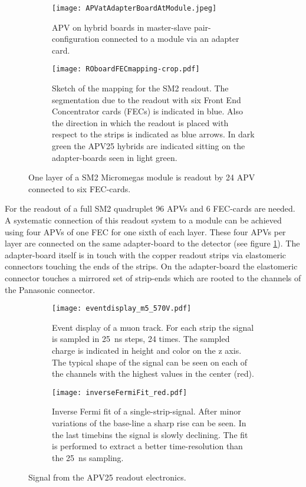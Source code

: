 \documentclass[
twoside,            %
BCOR1.4cm,          %
10pt,               %
headings=normal,    %
headsepline,        %
clearplainpage,		%
final,              %
div=14,
open=right,
bibliography=toc
]{scrreprt}
\begin{document}
\begin{figure}[!h]
	\begin{subfigure}[b]{0.48\textwidth}
		\centering
		\texttt{[image: APVatAdapterBoardAtModule.jpeg]}
		\caption{
			APV on hybrid boards in master-slave pair-configuration connected to a module via an adapter card.
		}
		\label{APVatAdapterAtModule} 
	\end{subfigure}
	\hfill
	\begin{subfigure}[b]{0.48\textwidth}
		\centering
		\texttt{[image: ROboardFECmapping-crop.pdf]}
		\caption{
			Sketch of the mapping for the SM2 readout.
			The segmentation due to the readout with six Front End Concentrator cards (FECs) is indicated in blue.
			Also the direction in which the readout is placed with respect to the strips is indicated as blue arrows.
			In dark green the APV25 hybrids are indicated sitting on the adapter-boards seen in light green.
		}
		\label{RObaordFECmapping} 
	\end{subfigure}
	\vspace{-2mm}
	\caption{
		One layer of a SM2 Micromegas module is readout by 24 APV connected to six FEC-cards.
	}
\end{figure}

For the readout of a full SM2 quadruplet 96 APVs and 6 FEC-cards are needed.
A systematic connection of this readout system to a module can be achieved using four APVs of one FEC for one sixth of each layer.
These four APVs per layer are connected on the same adapter-board to the detector (see figure \ref{APVatAdapterAtModule}).
The adapter-board itself is in touch with the copper readout strips via elastomeric connectors touching the ends of the strips.
On the adapter-board the elastomeric connector touches a mirrored set of strip-ends which are rooted to the channels of the Panasonic connector. 

\begin{figure}[!h]
	\begin{subfigure}[b]{0.48\textwidth}
		\centering
		\texttt{[image: eventdisplay\_m5\_570V.pdf]}
		\caption{
			Event display of a muon track.
			For each strip the signal is sampled in \SI{25}{ns} steps, 24 times.
			The sampled charge is indicated in height and color on the z axis.
			The typical shape of the signal can be seen on each of the channels with the highest values in the center (red).
		}
		\label{eventdisplay} 
	\end{subfigure}
	\hfill
	\begin{subfigure}[b]{0.48\textwidth}
		\centering
		\texttt{[image: inverseFermiFit\_red.pdf]}
		\caption{
			Inverse Fermi fit of a single-strip-signal.
			After minor variations of the base-line a sharp rise can be seen.
			In the last timebins the signal is slowly declining.
			The fit is performed to extract a better time-resolution than the \SI{25}{ns} sampling.
		}
		\label{inverseFermiFit} 
	\end{subfigure}
	\vspace{-2mm}
	\caption{
		Signal from the APV25 readout electronics.
	}
\end{figure}
\end{document}
